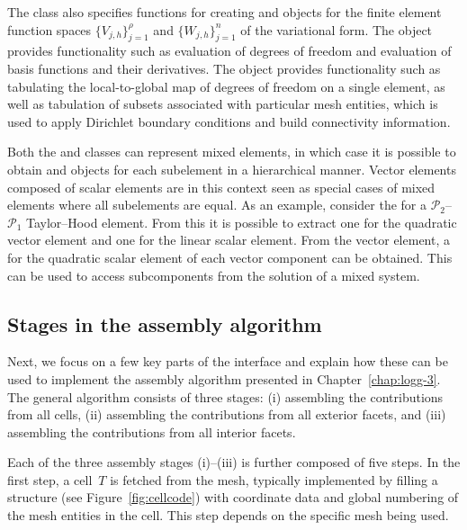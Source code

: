 The  class also specifies functions for creating
 and  objects for the finite
element function spaces $\{V_{j,h}\}_{j=1}^{\rho}$ and
$\{W_{j,h}\}_{j=1}^n$ of the variational form. The
 object provides functionality such as evaluation
of degrees of freedom and evaluation of basis functions and their
derivatives. The  object provides functionality such as
tabulating the local-to-global map of degrees of freedom on a single
element, as well as tabulation of subsets associated with particular
mesh entities, which is used to apply Dirichlet boundary conditions
and build connectivity information.

Both the  and  classes can
represent mixed elements, in which case it is possible to obtain
 and  objects for each subelement
in a hierarchical manner. Vector elements composed of scalar elements
are in this context seen as special cases of mixed elements where all
subelements are equal. As an example, consider the  for
a $\mathcal{P}_2$--$\mathcal{P}_1$ Taylor--Hood element. From this
 it is possible to extract one  for the
quadratic vector element and one  for the linear scalar
element. From the vector element, a  for the quadratic
scalar element of each vector component can be obtained. This can be
used to access subcomponents from the solution of a mixed system.

\subsection{Stages in the assembly algorithm}

Next, we focus on a few key parts of the interface and explain how
these can be used to implement the assembly algorithm presented in
Chapter~\ref{chap:logg-3}. The general algorithm consists of three
stages: (i) assembling the contributions from all cells, (ii)
assembling the contributions from all exterior facets, and (iii)
assembling the contributions from all interior facets.

Each of the three assembly stages (i)--(iii) is further composed of
five steps. In the first step, a cell~$T$ is fetched from the mesh,
typically implemented by filling a  structure (see
Figure~\ref{fig:cellcode}) with coordinate data and global numbering
of the mesh entities in the cell. This step depends on the specific
mesh being used.

